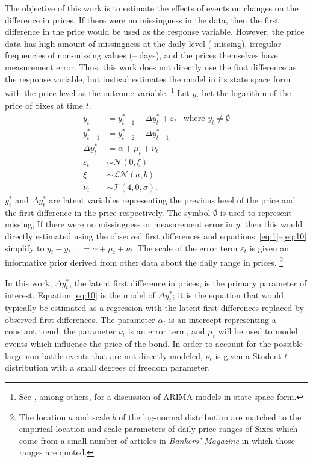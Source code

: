 \documentclass[11pt, oneside, article]{memoir}
\newcommand{\dist}[1]{\mathcal{#1}}
\newcommand{\paren}[1]{\mathopen{}\left(#1\right)\mathclose{}}
\newcommand{\disti}[2]{\ensuremath{\dist{#1}\paren{#2}}}
\newcommand{\dnorm}[1]{\disti{N}{#1}}
\newcommand{\dlnorm}[1]{\disti{LN}{#1}}
\newcommand{\dt}[1]{\disti{T}{#1}}
\begin{document}
The objective of this work is to estimate the effects of events on changes on the difference in prices.
If there were no missingness in the data, then the first difference in the price would be used as the response variable.
However, the price data has high amount of missingness at the daily level (\AcwSixesPctMissing{} missing), irregular frequencies of non-missing values (\AcwSixesDayDiffMin{}--\AcwSixesDayDiffMax{} days), and the prices themselves have measurement error.
Thus, this work does not directly use the first difference as the response variable, but instead estimates the model in its state space form with the price level as the outcome variable.%
\footnote{See \textcite{DurbinKoopman2001}, among others, for a discussion of ARIMA models in state space form.}
Let $y_{t}$ bet the logarithm of the price of Sixes at time $t$.
\begin{align}
  \label{eq:1}
  y_{t} &= y^{*}_{t - 1} + \Delta y^{*}_{t} + \varepsilon_{t} & \text{where $y_{t} \neq \emptyset$} \\
  \label{eq:9}
  y^{*}_{t - 1} &= y^{*}_{t-2} + \Delta y^{*}_{t-1} \\
  \label{eq:10}
  \Delta y^{*}_{t} &= \alpha + \mu_{t} + \nu_{t} \\
  \label{eq:11}
  \varepsilon_{t} &\sim \dnorm{0, \xi}  \\
  \label{eq:12}
  \xi & \sim \dlnorm{a, b} \\
  \label{eq:13}
  \nu_{t} &\sim \dt{4, 0, \sigma} \text{.}
\end{align}
$y^{*}_{t}$ and $\Delta y^{*}_{t}$ are latent variables representing the previous level of the price and the first difference in the price respectively.
The symbol $\emptyset$ is used to represent missing, 
If there were no missingness or measurement error in $y$, then this would directly estimated using the observed first differences and equations~\eqref{eq:1}--\eqref{eq:10}
simplify to  $y_{t} - y_{t-1} = \alpha + \mu_{t} + \nu_{t}$.
The scale of the error term $\varepsilon_{t}$ is given an informative prior derived from other data about the daily range in prices.%
\footnote{
  The location $a$ and scale $b$ of the log-normal distribution are matched to the empirical location and scale parameters of daily price ranges of Sixes which come from a small number of articles in \textit{Bankers' Magazine} in which those ranges are quoted.
}

In this work, $\Delta y^{*}_{t}$, the latent first difference in prices, is the primary parameter of interest.
Equation \eqref{eq:10} is the model of $\Delta y^{*}_{t}$; it is the equation that would typically be estimated as a regression with the latent first differences replaced by observed first differences.
The parameter $\alpha_{t}$ is an intercept representing a constant trend, the parameter $\nu_{t}$ is an error term, and $\mu_{t}$ will be used to model events which influence the price of the bond.
In order to account for the possible large non-battle events that are not directly modeled, $\nu_{t}$ is given a Student-$t$ distribution with a small degrees of freedom parameter.
\end{document}
